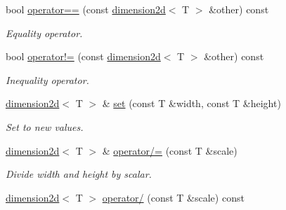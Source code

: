 \begin{DoxyCompactItemize}
\mbox{\label{classirr_1_1core_1_1dimension2d_acb4e8b532083b57ee9849703657c7309}} 
bool \hyperlink{classirr_1_1core_1_1dimension2d_acb4e8b532083b57ee9849703657c7309}{operator==} (const \hyperlink{classirr_1_1core_1_1dimension2d}{dimension2d}$<$ T $>$ \&other) const
\begin{DoxyCompactList}\small\item\em Equality operator. \end{DoxyCompactList}\item 
\mbox{\label{classirr_1_1core_1_1dimension2d_a7bc8e7a51170f1e0758476d5fac4ff1b}} 
bool \hyperlink{classirr_1_1core_1_1dimension2d_a7bc8e7a51170f1e0758476d5fac4ff1b}{operator!=} (const \hyperlink{classirr_1_1core_1_1dimension2d}{dimension2d}$<$ T $>$ \&other) const
\begin{DoxyCompactList}\small\item\em Inequality operator. \end{DoxyCompactList}\item 
\mbox{\label{classirr_1_1core_1_1dimension2d_a81860d7ff5a888a37af84f7bbbad7c91}} 
\hyperlink{classirr_1_1core_1_1dimension2d}{dimension2d}$<$ T $>$ \& \hyperlink{classirr_1_1core_1_1dimension2d_a81860d7ff5a888a37af84f7bbbad7c91}{set} (const T \&width, const T \&height)
\begin{DoxyCompactList}\small\item\em Set to new values. \end{DoxyCompactList}\item 
\mbox{\label{classirr_1_1core_1_1dimension2d_ac581fbe07dabf2a342314c7a73f862c8}} 
\hyperlink{classirr_1_1core_1_1dimension2d}{dimension2d}$<$ T $>$ \& \hyperlink{classirr_1_1core_1_1dimension2d_ac581fbe07dabf2a342314c7a73f862c8}{operator/=} (const T \&scale)
\begin{DoxyCompactList}\small\item\em Divide width and height by scalar. \end{DoxyCompactList}\item 
\mbox{\label{classirr_1_1core_1_1dimension2d_a927291115ac1098aeb5f98de6ce306ea}} 
\hyperlink{classirr_1_1core_1_1dimension2d}{dimension2d}$<$ T $>$ \hyperlink{classirr_1_1core_1_1dimension2d_a927291115ac1098aeb5f98de6ce306ea}{operator/} (const T \&scale) const

\end{DoxyCompactItemize}
